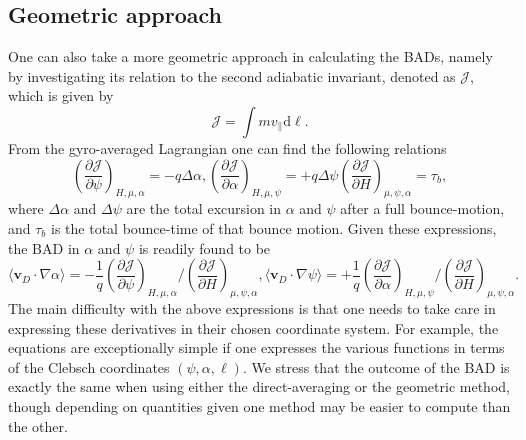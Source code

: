 \subsection{Geometric approach} \label{sec:geom-approach}
One can also take a more geometric approach in calculating the BADs, namely by investigating its relation to the second adiabatic invariant, denoted as $\mathcal{J}$, which is given by
\begin{equation}
    \mathcal{J} = \int m v_\parallel \mathrm{d} \ell.
\end{equation}
From the gyro-averaged Lagrangian one can find the following relations \cite{helander2014theory}
\begin{subequations}
\label{eq:whole}
\begin{equation}
\left( \frac{\partial \mathcal{J}}{\partial \psi} \right)_{H,\mu,\alpha} = - q \Delta \alpha,\label{subeq_dJ:1}
\end{equation}
\begin{equation}
\left( \frac{\partial \mathcal{J}}{\partial \alpha} \right)_{H,\mu,\psi} = + q \Delta \psi 
\end{equation}
\begin{equation}
\left( \frac{\partial \mathcal{J}}{\partial H} \right)_{\mu,\psi,\alpha} = \tau_b \label{subeq_dJ:3},
\end{equation}
\end{subequations}
where $\Delta \alpha$ and $\Delta \psi$ are the total excursion in $\alpha$ and $\psi$ after a full bounce-motion, and $\tau_b$ is the total bounce-time of that bounce motion. Given these expressions, the BAD in $\alpha$ and $\psi$ is readily found to be
\begin{subequations}
\label{eq:whole}
\begin{equation}
\langle \mathbf{v}_D \cdot \nabla \alpha \rangle = - \frac{1}{q} \left( \frac{\partial \mathcal{J}}{\partial \psi} \right)_{H,\mu,\alpha} \Bigg/ \left( \frac{\partial \mathcal{J}}{\partial H} \right)_{\mu,\psi,\alpha},\label{subeq:1}
\end{equation}
\begin{equation}
\langle \mathbf{v}_D \cdot \nabla \psi \rangle = + \frac{1}{q} \left( \frac{\partial \mathcal{J}}{\partial \alpha} \right)_{H,\mu,\psi} \Bigg/ \left( \frac{\partial \mathcal{J}}{\partial H} \right)_{\mu,\psi,\alpha} \label{subeq:2}.
\end{equation}
\end{subequations}
The main difficulty with the above expressions is that one needs to take care in expressing these derivatives in their chosen coordinate system. For example, the equations are exceptionally simple if one expresses the various functions in terms of the Clebsch coordinates $(\psi,\alpha,\ell)$. We stress that the outcome of the BAD is exactly the same when using either the direct-averaging or the geometric method, though depending on quantities given one method may be easier to compute than the other. \par
